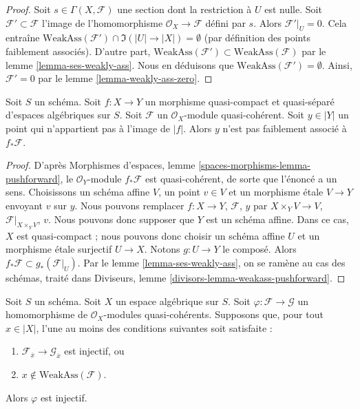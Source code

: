 \begin{proof}
Soit $s \in \Gamma(X, \mathcal{F})$ une section dont la restriction à $U$ est nulle.
Soit $\mathcal{F}' \subset \mathcal{F}$ l'image de l'homomorphisme
$\mathcal{O}_X \to \mathcal{F}$ défini par $s$. Alors $\mathcal{F}'|_U = 0$.
Cela entraîne
$\text{WeakAss}(\mathcal{F}') \cap \Im(|U| \to |X|) = \emptyset$
(par définition des points faiblement associés).
D'autre part,
$\text{WeakAss}(\mathcal{F}') \subset \text{WeakAss}(\mathcal{F})$
par le lemme \ref{lemma-ses-weakly-ass}. Nous en déduisons que
$\text{WeakAss}(\mathcal{F}') = \emptyset$.
Ainsi, $\mathcal{F}' = 0$ par le lemme \ref{lemma-weakly-ass-zero}.
\end{proof}

\begin{lemma}
\label{lemma-weakass-pushforward}
Soit $S$ un schéma. Soit $f : X \to Y$ un morphisme quasi-compact et quasi-séparé
d'espaces algébriques sur $S$. Soit $\mathcal{F}$ un
$\mathcal{O}_X$-module quasi-cohérent. Soit $y \in |Y|$ un point qui n'appartient pas à
l'image de $|f|$. Alors $y$ n'est pas faiblement associé à $f_*\mathcal{F}$.
\end{lemma}

\begin{proof}
D'après Morphismes d'espaces, lemme \ref{spaces-morphisms-lemma-pushforward},
le $\mathcal{O}_Y$-module $f_*\mathcal{F}$ est quasi-cohérent, de sorte que
l'énoncé a un sens.
Choisissons un schéma affine $V$, un point $v \in V$ et un morphisme \'etale
$V \to Y$ envoyant $v$ sur $y$. Nous pouvons remplacer
$f : X \to Y$, $\mathcal{F}$, $y$ par
$X \times_Y V \to V$, $\mathcal{F}|_{X \times_Y V}$, $v$.
Nous pouvons donc supposer que $Y$ est un schéma affine.
Dans ce cas, $X$ est quasi-compact ; nous pouvons donc choisir
un schéma affine $U$ et un morphisme \'etale surjectif $U \to X$.
Notons $g : U \to Y$ le composé.
Alors $f_*\mathcal{F} \subset g_*(\mathcal{F}|_U)$.
Par le lemme \ref{lemma-ses-weakly-ass},
on se ramène au cas des schémas, traité dans
Diviseurs, lemme \ref{divisors-lemma-weakass-pushforward}.
\end{proof}

\begin{lemma}
\label{lemma-check-injective-on-weakass}
Soit $S$ un schéma. Soit $X$ un espace algébrique sur $S$.
Soit $\varphi : \mathcal{F} \to \mathcal{G}$ un homomorphisme de
$\mathcal{O}_X$-modules quasi-cohérents. Supposons que, pour tout
$x \in |X|$, l'une au moins des conditions suivantes soit satisfaite :
\begin{enumerate}
\item $\mathcal{F}_{\overline{x}} \to \mathcal{G}_{\overline{x}}$
est injectif, ou
\item $x \not \in \text{WeakAss}(\mathcal{F})$.
\end{enumerate}
Alors $\varphi$ est injectif.
\end{lemma}

